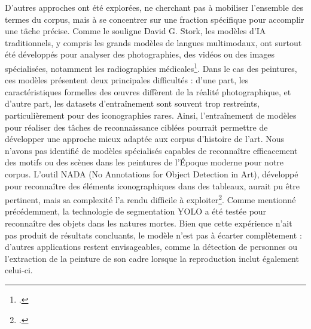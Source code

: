 D’autres approches ont été explorées, ne cherchant pas à mobiliser l’ensemble des termes du corpus, mais à se concentrer sur une fraction spécifique pour accomplir une tâche précise. Comme le souligne David G. Stork, les modèles d’IA traditionnels, y compris les grands modèles de langues multimodaux, ont surtout été développés pour analyser des photographies, des vidéos ou des images spécialisées, notamment les radiographies médicales\footcite[p. 72-73]{storkComputerVisionML2024}. Dans le cas des peintures, ces modèles présentent deux principales difficultés : d’une part, les caractéristiques formelles des œuvres diffèrent de la réalité photographique, et d’autre part, les datasets d’entraînement sont souvent trop restreints, particulièrement pour des iconographies rares. Ainsi, l’entraînement de modèles pour réaliser des tâches de reconnaissance ciblées pourrait permettre de développer une approche mieux adaptée aux corpus d’histoire de l’art. Nous n’avons pas identifié de modèles spécialisés capables de reconnaître efficacement des motifs ou des scènes dans les peintures de l’Époque moderne pour notre corpus. L’outil NADA (No Annotations for Object Detection in Art), développé pour reconnaître des éléments iconographiques dans des tableaux, aurait pu être pertinent, mais sa complexité l’a rendu difficile à exploiter\footcite{ramosNoAnnotationsObject2024}. Comme mentionné précédemment, la technologie de segmentation YOLO a été testée pour reconnaître des objets dans les natures mortes. Bien que cette expérience n’ait pas produit de résultats concluants, le modèle n’est pas à écarter complètement : d’autres applications restent envisageables, comme la détection de personnes ou l’extraction de la peinture de son cadre lorsque la reproduction inclut également celui-ci. 

